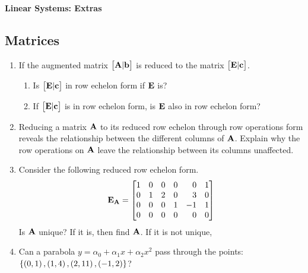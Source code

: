\documentclass[9pt]{article}
\def\mf{\ensuremath\mathbf}
\def\lp{\ensuremath\left(}
\def\rp{\ensuremath\right)}
\def\lc{\ensuremath\left\{}
\def\rc{\ensuremath\right\}}
\def\bmx{\ensuremath\begin{bmatrix*}[r]}
\def\emx{\ensuremath\end{bmatrix*}}
\newcommand{\ct}[1]{\lp #1\rp}
\begin{document}
\begin{center}
\begin{Large}
\textbf{Linear Systems: Extras}
\end{Large}
\end{center}
\vspace{0.2cm}

\begin{multicols}{2}

\section*{Matrices}
\begin{enumerate}[resume]
    \item If the augmented matrix $\bmx \mf{A} \vert \mf{b}\emx$ is reduced to the matrix $\bmx \mf{E} \vert \mf{c} \emx$.
    \begin{enumerate}
        \item Is $\bmx \mf{E} \vert \mf{c} \emx$ in row echelon form if $\mf{E}$ is?
        \item If $\bmx \mf{E} \vert \mf{c} \emx$ is in row echelon form, is $\mf{E}$ also in row echelon form? 
    \end{enumerate}

    \item Reducing a matrix $\mf{A}$ to its reduced row echelon through row operations form reveals the relationship between the different columns of $\mf{A}$. Explain why the row operations on $\mf{A}$ leave the relationship between its columns unaffected.

    \item Consider the following reduced row echelon form.
    \[ \mf{E_A} = \bmx
        1 & 0 & 0 & 0 & 0 & 1\\
        0 & 1 & 2 & 0 & 3 & 0\\
        0 & 0 & 0 & 1 & -1 & 1\\
        0 & 0 & 0 & 0 & 0 & 0
    \emx \]
    Is $\mf{A}$ unique? If it is, then find $\mf{A}$. If it is not unique,

    \item Can a parabola $y = \alpha_0 + \alpha_1x + \alpha_2x^2$ pass through the points: $\lc \ct{0, 1}, \ct{1, 4}, \ct{2, 11}, \ct{-1, 2}\rc$?


\end{enumerate}
\end{multicols}
\end{document}
